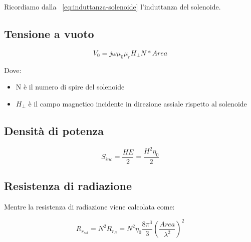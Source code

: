 \documentclass[10pt,a4paper]{report}
\begin{document}
			Ricordiamo dalla ~\ref{eq:induttanza-solenoide} l'induttanza del solenoide.

		 	\subsection{Tensione a vuoto}

				 \[
				 V_0=j\omega\mu_0\mu_rH_{\perp}N*Area
				 \]

				 Dove:
				 \begin{itemize}
				 \item N è il numero di spire del solenoide 
				 \item $H_{\perp}$ è il campo magnetico incidente in direzione assiale rispetto al solenoide
				 \end{itemize}

			\subsection{Densità di potenza}

			 	\[
			 	S_{inc}=\frac{HE}{2}=\frac{H^2\eta_0}{2}
			 	\]

			\subsection{Resistenza di radiazione}
				 Mentre la resistenza di radiazione viene calcolata come:

				 \[
				 R_{r_{sol}}=N^2R_{r_{R}}=N^2\eta_0\frac{8\pi^3}{3}(\frac{Area}{\lambda^2})^2
				 \]


        \newpage
        \null 
        \thispagestyle{empty} 
        \newpage
        
        \newpage
        \null 
        \thispagestyle{empty} 
        \newpage
\end{document}
